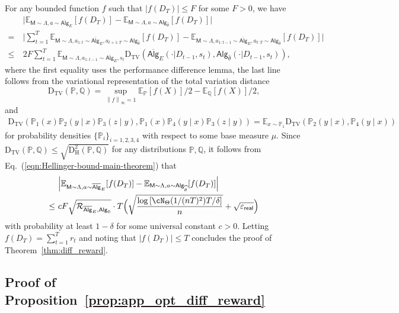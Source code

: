 \documentclass[10pt]{article}
\renewcommand{\epsilon}{\varepsilon}
\newcommand{\norm}[1]{\left\|{#1}\right\|}
\newcommand{\linf}[1]{\norm{#1}_\infty}
\newcommand{\<}{\left\langle}
\renewcommand{\>}{\right\rangle}
\newcommand{\brac}[1]{{\left[ #1 \right]}}
\newcommand{\E}{\mathbb{E}}
\renewcommand{\P}{\mathbb{P}}
\newcommand{\Q}{\mathbb{Q}}
\newcommand{\inst}{{\mathsf{M}}}
\newcommand{\HelDs}{{\mathrm{D}^2_{\mathrm{H}}}}
\newcommand{\VarD}{{\mathrm{D}_{\mathrm{TV}}}}
\newcommand{\state}{{s}}
\newcommand{\action}{{a}}
\newcommand{\reward}{{r}}
\newcommand{\totlen}{{T}}
\newcommand{\sAlg}{{\mathsf{Alg}}}
\newcommand{\osAlg}{\overline{\mathsf{Alg}}}
\newcommand{\dset}{{D}}
\newcommand{\Numobs}{{n}}
\newcommand{\Parspace}{{\Theta}}
\newcommand{\EstPar}{{\widehat{\theta}}}
\newcommand{\prior}{{\Lambda}}
\newcommand{\shortexp}{{E}}
\newcommand{\geneps}{{\epsilon}_{\sf real}}
\newcommand{\distratio}{{\mathcal{R}}}
\def\sP{{\mathbb{P}}}
\def\sQ{{\mathbb{Q}}}
\begin{document}
For any bounded function $f$ such that $|f(\dset_\totlen)|\leq F$ for some $F>0$,  we have
\begin{align*}
  &~ \Big| \E_{\inst\sim\prior,\action\sim\osAlg_\shortexp}[f(\dset_\totlen)]-
   \E_{\inst\sim\prior,\action\sim\sAlg_\EstPar}[f(\dset_\totlen)]\Big|
   \\
   =&~
\Big| \sum_{t=1}^\totlen\E_{\inst\sim\prior,\action_{1:t}\sim\osAlg_\shortexp,\action_{t+1:\totlen}\sim\sAlg_\EstPar}[f(\dset_\totlen)]-
\E_{\inst\sim\prior,\action_{1:t-1}\sim\osAlg_{\shortexp},\action_{t:\totlen}\sim\sAlg_\EstPar}[f(\dset_\totlen)]\Big|
   \\
\leq&~
2F\sum_{t=1}^\totlen\E_{\inst\sim\prior,\action_{1:t-1}\sim\osAlg_{\shortexp},\state_t}\VarD(\osAlg_{\shortexp}(\cdot|\dset_{t-1},\state_t),\sAlg_{\EstPar}(\cdot|\dset_{t-1},\state_t)),
\end{align*}
where the first equality uses the performance difference lemma, the last line follows from the variational representation of the total variation distance $$\VarD(\sP,\sQ)=\sup_{\linf{f}=1}\E_\sP[f(X)]/2-\E_\sQ[f(X)]/2,$$  and \begin{align}
\VarD(\sP_1(x)\sP_2(y\mid x)\sP_3(z\mid y),\sP_1(x)\sP_{4}(y\mid x)\sP_3(z\mid y))=\E_{x\sim\sP_1}\VarD(\sP_2(y\mid x),\sP_{4}(y\mid x))\label{eq:kl_telescope}
\end{align} 
for probability densities $\{ \P_i\}_{i=1,2,3,4}$ with respect to some base measure $\mu$. Since $\VarD(\P,\Q)\leq\sqrt{\HelDs(\P,\Q)}$ for any distributions $\P,\Q$,  it follows from Eq.~(\ref{eqn:Hellinger-bound-main-theorem}) that
\begin{align*}
 &~ \Big| \E_{\inst\sim\prior,\action\sim\osAlg_{\shortexp}}[f(\dset_\totlen)]-
   \E_{\inst\sim\prior,\action\sim\sAlg_\EstPar}[f(\dset_\totlen)]\Big|\\


  \leq &~cF\sqrt{\distratio_{\osAlg_{\shortexp},\sAlg_0}}\cdot\totlen\Big(\sqrt{\frac{\log \brac{ \cN_{\Parspace}(1/(\Numobs\totlen)^2) \totlen/\delta } }{n}} + \sqrt{\geneps}\Big)
\end{align*}
with probability at least $1-\delta$ for some universal constant $c>0$. Letting $f(\dset_\totlen)=\sum_{t=1}^\totlen\reward_t$  and noting that  $|f(\dset_\totlen)|\leq\totlen$ concludes the proof of Theorem~\ref{thm:diff_reward}.









\subsection{Proof of Proposition~\ref{prop:app_opt_diff_reward}}\label{app:proof-prop-diff-reward-app-opt}
\end{document}
